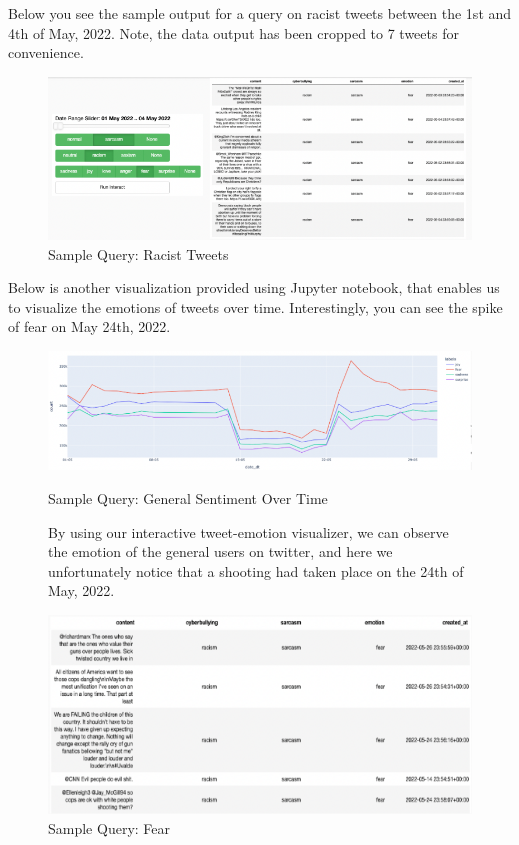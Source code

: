 \documentclass[a4paper,12pt]{article}
\begin{document}
Below you see the sample output for a query on racist tweets between the 1st and 4th of May, 2022. Note, the data output
has been cropped to 7 tweets for convenience.

\begin{figure}[h]
	\centering
	\includegraphics[width=\textwidth]{racism.png}
	\caption{Sample Query: Racist Tweets}
	\label{fig:Racist-Tweet-Query}
\end{figure}

Below is another visualization provided using Jupyter notebook, that enables us to visualize the emotions of tweets over time.
Interestingly, you can see the spike of fear on May 24th, 2022.

\begin{figure}[h]
{\centering
	\includegraphics[width=\textwidth]{graph.png}
	\caption{Sample Query: General Sentiment Over Time}
	\label{fig:Emotion-Time-Query}
}
	\vspace{5mm} %
By using our interactive tweet-emotion visualizer, we can
observe the emotion of the general users on twitter, and here we unfortunately notice that a shooting had taken place
on the 24th of May, 2022.
	{
	\centering
	\includegraphics[width=\textwidth]{graphTweets.png}
	\caption{Sample Query: Fear}
	\label{fig:Fear-Query}
}
\end{figure}
\end{document}
